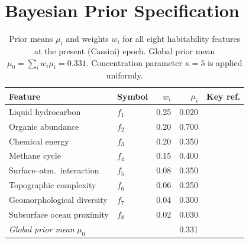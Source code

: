 \chapter{Bayesian Prior Specification}
\label{app:priors}

\begin{table}[H]
\centering
\begin{tabular}{llrrl}
\toprule
\textbf{Feature} & \textbf{Symbol} & \textbf{$w_i$} & \textbf{$\mu_i$} & \textbf{Key ref.} \\
\midrule
Liquid hydrocarbon         & $f_1$ & 0.25 & 0.020 & \citet{Hayes2008} \\
Organic abundance          & $f_2$ & 0.20 & 0.700 & \citet{Malaska2025} \\
Chemical energy            & $f_3$ & 0.20 & 0.350 & \citet{McKaySmith2005} \\
Methane cycle              & $f_4$ & 0.15 & 0.400 & \citet{MitchellLora2016} \\
Surface--atm.\ interaction & $f_5$ & 0.08 & 0.350 & \citet{Miller2021channels} \\
Topographic complexity     & $f_6$ & 0.06 & 0.250 & \citet{Corlies2017Titan} \\
Geomorphological diversity & $f_7$ & 0.04 & 0.300 & \citet{Lopes2019} \\
Subsurface ocean proximity & $f_8$ & 0.02 & 0.030 & \citet{Iess2012} \\
\midrule
\multicolumn{3}{l}{\textit{Global prior mean} $\mu_0$} & 0.331 & \\
\bottomrule
\end{tabular}
\caption{Prior means $\mu_i$ and weights $w_i$ for all eight habitability
features at the present (Cassini) epoch.  Global prior mean
$\mu_0 = \sum_i w_i\mu_i = 0.331$.  Concentration parameter $\kappa = 5$
is applied uniformly.}
\label{tab:priors}
\end{table}
